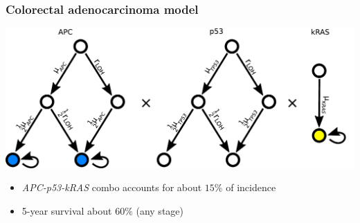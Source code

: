 \documentclass{beamer}
\begin{document}
\begin{frame}
    \frametitle{Colorectal adenocarcinoma model}
    \begin{center}
        \includegraphics[width=1.0\textwidth]{figures/diagram5}
    \end{center}

    \begin{center}
    \begin{itemize}
        \item \emph{APC-p53-kRAS} combo accounts for about $15\%$ of incidence
        \item 5-year survival about $60\%$ (any stage)
    \end{itemize}
    \end{center}

\end{frame}
\end{document}
